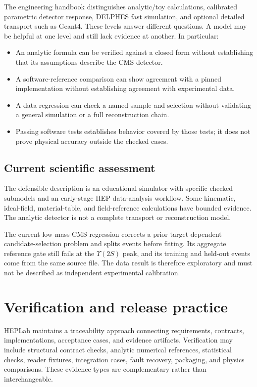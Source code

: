 \documentclass[11pt,a4paper]{article}
\begin{document}
The engineering handbook distinguishes analytic/toy calculations, calibrated
parametric detector response, DELPHES fast simulation, and optional detailed
transport such as Geant4. These levels answer different questions. A model may
be helpful at one level and still lack evidence at another. In particular:

\begin{itemize}
  \item An analytic formula can be verified against a closed form without
  establishing that its assumptions describe the CMS detector.
  \item A software-reference comparison can show agreement with a pinned
  implementation without establishing agreement with experimental data.
  \item A data regression can check a named sample and selection without
  validating a general simulation or a full reconstruction chain.
  \item Passing software tests establishes behavior covered by those tests; it
  does not prove physical accuracy outside the checked cases.
\end{itemize}

\subsection{Current scientific assessment}

The defensible description is an educational simulator with specific checked
submodels and an early-stage HEP data-analysis workflow. Some kinematic,
ideal-field, material-table, and field-reference calculations have bounded
evidence. The analytic detector is not a complete transport or reconstruction
model.

The current low-mass CMS regression corrects a prior target-dependent
candidate-selection problem and splits events before fitting. Its aggregate
reference gate still fails at the $\Upsilon(2S)$ peak, and its training and
held-out events come from the same source file. The data result is therefore
exploratory and must not be described as independent experimental calibration.

\section{Verification and release practice}

HEPLab maintains a traceability approach connecting requirements, contracts,
implementations, acceptance cases, and evidence artifacts. Verification may
include structural contract checks, analytic numerical references, statistical
checks, reader fixtures, integration cases, fault recovery, packaging, and
physics comparisons. These evidence types are complementary rather than
interchangeable.
\end{document}
